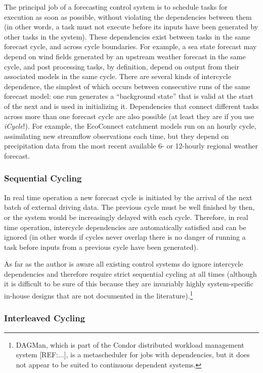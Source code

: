\documentclass[11pt,a4paper]{article}
\begin{document}
The principal job of a forecasting control system is to schedule tasks
for execution as soon as possible, without violating the dependencies
between them (in other words, a task must not execute before its inputs
have been generated by other tasks in the system). These dependencies
exist between tasks in the same forecast cycle, and across cycle
boundaries.  For example, a sea state forecast may depend on wind fields
generated by an upstream weather forecast in the same cycle, and post
processing tasks, by definition, depend on output from their associated
models in the same cycle.  There are several kinds of intercycle
dependence, the simplest of which occurs between consecutive runs of the
same forecast model: one run generates a ``background state'' that is
valid at the start of the next and is used in initializing it.
Dependencies that connect different tasks across more than one forecast
cycle are also possible (at least they are if you use {\em iCycle}!).
For example, the EcoConnect catchment models run on an hourly cycle,
assimilating new streamflow observations each time, but they depend on
precipitation data from the most recent available 6- or 12-hourly
regional weather forecast.

\subsubsection{Sequential Cycling}

In real time operation a new forecast cycle is initiated by the arrival
of the next batch of external driving data. The previous cycle must be
well finished by then, or the system would be increasingly delayed
with each cycle.  Therefore, in real time operation, intercycle
dependencies are automatically satisfied and can be ignored (in other
words if cycles never overlap there is no danger of running a task
before inputs from a previous cycle have been generated).

As far as the author is aware all existing control systems do ignore
intercycle dependencies and therefore require strict sequential cycling
at all times (although it is difficult to be sure of this because they
are invariably highly system-specific in-house designs that are not
documented in the literature).\footnote{DAGMan, which is part of the
Condor distributed workload management system [REF:...], is a
metascheduler for jobs with dependencies, but it does not appear to be
suited to continuous dependent systems.} 

\subsubsection{Interleaved Cycling}
\end{document}
